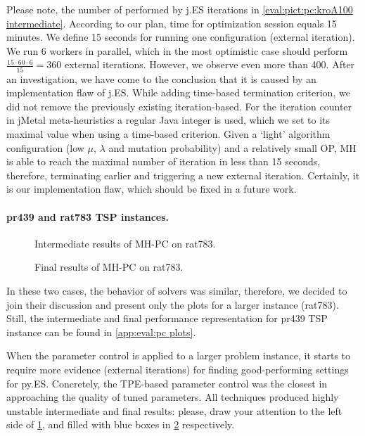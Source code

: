 Please note, the number of performed by j.ES iterations in \cref{eval:pict:pc:kroA100 intermediate}. According to our plan, time for optimization session equals 15 minutes. We define 15 seconds for running one configuration (external iteration). We run 6 workers in parallel, which in the most optimistic case should perform $\frac{15\cdot60\cdot6}{15} = 360$ external iterations. However, we observe even more than 400. After an investigation, we have come to the conclusion that it is caused by an implementation flaw of j.ES. While adding time-based termination criterion, we did not remove the previously existing iteration-based. For the iteration counter in jMetal meta-heuristics a regular Java integer is used, which we set to its maximal value when using a time-based criterion. Given a `light' algorithm configuration (low $\mu$, $\lambda$ and mutation probability) and a relatively small OP, MH is able to reach the maximal number of iteration in less than 15 seconds, therefore, terminating earlier and triggering a new external iteration. Certainly, it is our implementation flaw, which should be fixed in a future work.

\paragraph{pr439 and rat783 TSP instances.}
\begin{figure}[t]
	\centering
	\vspace{-20pt}
	
	\caption{Intermediate results of MH-PC on rat783.}
	\vspace{-5pt}
	\label{eval:pict:pc:rat783 intermediate}
\end{figure}
\begin{figure}[b]
	\centering
	\vspace{-20pt}
	
	\caption{Final results of MH-PC on rat783.}
	\vspace{-5pt}
	\label{eval:pict:pc:rat783 final}
\end{figure}

In these two cases, the behavior of solvers was similar, therefore, we decided to join their discussion and present only the plots for a larger instance (rat783). Still, the intermediate and final performance representation for pr439 TSP instance can be found in \cref{app:eval:pc plots}.

When the parameter control is applied to a larger problem instance, it starts to require more evidence (external iterations) for finding good-performing settings for py.ES. Concretely, the TPE-based parameter control was the closest in approaching the quality of tuned parameters. All techniques produced highly unstable intermediate and final results: please, draw your attention to the left side of \cref{eval:pict:pc:rat783 intermediate}, and filled with blue boxes in \cref{eval:pict:pc:rat783 final} respectively.

